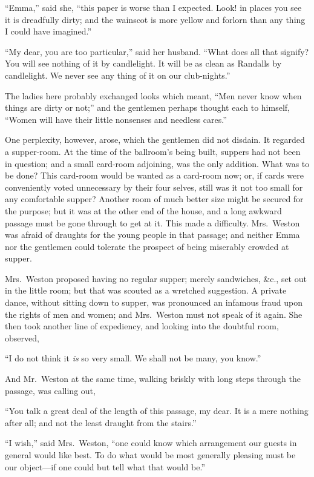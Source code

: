 ``Emma,'' said she, ``this paper is worse than I expected.
Look! in places you see it is dreadfully dirty; and the wainscot
is more yellow and forlorn than any thing I could have imagined.''

``My dear, you are too particular,'' said her husband.  ``What does
all that signify?  You will see nothing of it by candlelight.
It will be as clean as Randalls by candlelight.  We never see any
thing of it on our club-nights.''

The ladies here probably exchanged looks which meant, ``Men never
know when things are dirty or not;'' and the gentlemen perhaps
thought each to himself, ``Women will have their little nonsenses
and needless cares.''

One perplexity, however, arose, which the gentlemen did not disdain.
It regarded a supper-room.  At the time of the ballroom's being built,
suppers had not been in question; and a small card-room adjoining,
was the only addition.  What was to be done?  This card-room would
be wanted as a card-room now; or, if cards were conveniently voted
unnecessary by their four selves, still was it not too small for
any comfortable supper?  Another room of much better size might be
secured for the purpose; but it was at the other end of the house,
and a long awkward passage must be gone through to get at it.
This made a difficulty.  Mrs.\ Weston was afraid of draughts
for the young people in that passage; and neither Emma nor the
gentlemen could tolerate the prospect of being miserably crowded
at supper.

Mrs.\ Weston proposed having no regular supper; merely sandwiches,
\&c., set out in the little room; but that was scouted as a
wretched suggestion.  A private dance, without sitting down to supper,
was pronounced an infamous fraud upon the rights of men and women;
and Mrs.\ Weston must not speak of it again.  She then took another
line of expediency, and looking into the doubtful room, observed,

``I do not think it \emph{is} so very small.  We shall not be many,
you know.''

And Mr.\ Weston at the same time, walking briskly with long steps
through the passage, was calling out,

``You talk a great deal of the length of this passage, my dear.
It is a mere nothing after all; and not the least draught from
the stairs.''

``I wish,'' said Mrs.\ Weston, ``one could know which arrangement our
guests in general would like best.  To do what would be most generally
pleasing must be our object---if one could but tell what that would be.''

